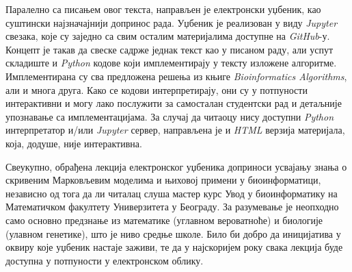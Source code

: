 \documentclass[12pt,oneside]{memoir}
\begin{document}
\begin{CJK}{UTF8}{ipxm}
Паралелно са писањем овог текста, направљен је електронски уџбеник, као суштински најзначајнији допринос рада. Уџбеник је реализован у виду \textit{Jupyter} свезака, које су заједно са свим осталим материјалима доступне на \textit{GitHub}-у\cite{vasovich2021}. Концепт је такав да свеске садрже једнак текст као у писаном раду, али успут складиште и \textit{Python} кодове који имплементирају у тексту изложене алгоритме. Имплементирана су сва предложена решења из књиге \textit{Bioinformatics Algorithms}, али и многа друга. Како се кодови интерпретирају, они су у потпуности интерактивни и могу лако послужити за самосталан студентски рад и детаљније упознавање са имплементацијама. За случај да читаоцу нису доступни \textit{Python} интерпретатор и/или \textit{Jupyter} сервер, направљена је и \textit{HTML} верзија материјала, која, додуше, није интерактивна.

Свеукупно, обрађена лекција електронског уџбеника доприноси усвајању знања о скривеним Марковљевим моделима и њиховој примени у биоинформатици, независно од тога да ли читалац слуша мастер курс Увод у биоинформатику на Математичком факултету Универзитета у Београду. За разумевање је неопходно само основно предзнање из математике (углавном вероватноће) и биологије (улавном генетике), што је ниво средње школе. Било би добро да иницијатива у оквиру које уџбеник настаје заживи, те да у најскоријем року свака лекција буде доступна у потпуности у електронском облику.

\literatura

\end{CJK}
\end{document}
